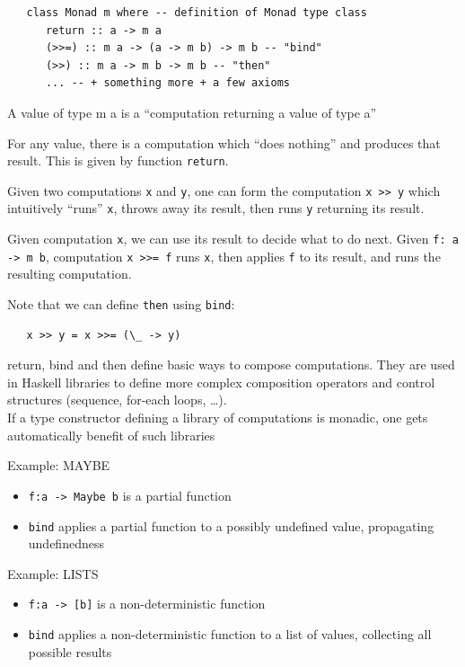 \begin{lstlisting}
   class Monad m where -- definition of Monad type class
      return :: a -> m a
      (>>=) :: m a -> (a -> m b) -> m b -- "bind"
      (>>) :: m a -> m b -> m b -- "then"
      ... -- + something more + a few axioms
\end{lstlisting}
A value of type m a is a ``computation returning a value of type a''

For any value, there is a computation which ``does nothing'' and
produces that result. This is given by function \lstinline|return|.

Given two computations \lstinline|x| and \lstinline|y|, one can form the computation
\lstinline|x >> y| which intuitively ``runs'' \lstinline|x|, throws away its result, then runs \lstinline|y| returning its result.

Given computation \lstinline|x|, we can use its result to decide what to do next.
Given \lstinline|f: a -> m b|, computation \lstinline|x >>= f| runs \lstinline|x|, then applies
\lstinline|f| to its result, and runs the resulting computation.

Note that we can define \lstinline|then| using \lstinline|bind|:
\begin{lstlisting}
   x >> y = x >>= (\_ -> y)
\end{lstlisting}


return, bind and then define basic ways to compose computations.
They are used in Haskell libraries to define more complex composition
operators and control structures (sequence, for-each loops, \dots).\\
If a type constructor defining a library of computations is monadic, one
gets automatically benefit of such libraries

Example: MAYBE
\begin{itemize}
	\item \lstinline|f:a -> Maybe b| is a partial function
	\item \lstinline|bind| applies a partial function to a possibly undefined value, propagating undefinedness
\end{itemize}
Example: LISTS
\begin{itemize}
	\item \lstinline|f:a -> [b]| is a non-deterministic function
	\item \lstinline|bind| applies a non-deterministic function to a list of values, collecting all possible results

\end{itemize}
